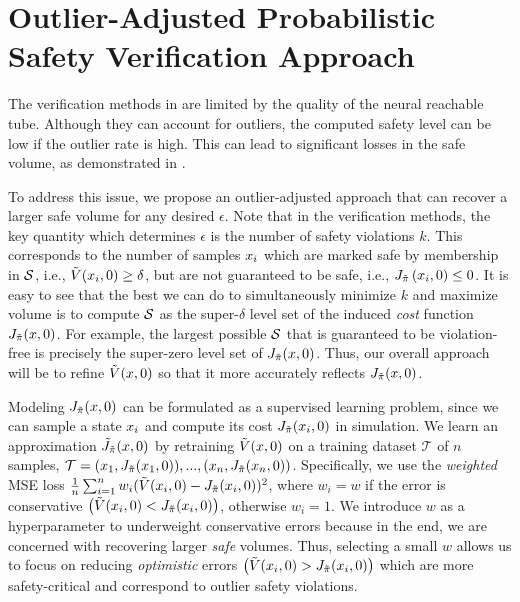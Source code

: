 \section{Outlier-Adjusted Probabilistic Safety Verification Approach}
\vspace{-0.5em}
The verification methods in  are limited by the quality of the neural reachable tube.
Although they can account for outliers, the computed safety level can be low if the outlier rate is high.
This can lead to significant losses in the safe volume, as demonstrated in .

To address this issue, we propose an outlier-adjusted approach that can recover a larger safe volume for any desired $\epsilon$.
Note that in the verification methods, the key quantity which determines $\epsilon$ is the number of safety violations $k$.
This corresponds to the number of samples $x_i$ which are marked safe by membership in $\mathcal{S}$, i.e., $\Tilde{V}(x_i,0) \ge \delta$, but are not guaranteed to be safe, i.e., $J_{\Tilde{\pi}}\left(x_i,0\right) \le 0$.
It is easy to see that the best we can do to simultaneously minimize $k$ and maximize volume is to compute $\mathcal{S}$ as the super-$\delta$ level set of the induced \textit{cost} function $J_{\Tilde{\pi}}(x,0)$.
For example, the largest possible $\mathcal{S}$ that is guaranteed to be violation-free is precisely the super-zero level set of $J_{\Tilde{\pi}}(x,0)$.
Thus, our overall approach will be to refine $\Tilde{V}(x,0)$ so that it more accurately reflects $J_{\Tilde{\pi}}(x,0)$.

Modeling $J_{\Tilde{\pi}}(x,0)$ can be formulated as a supervised learning problem, since we can sample a state $x_i$ and compute its cost $J_{\Tilde{\pi}}(x_i,0)$ in simulation.
We learn an approximation $\Tilde{J}_{\Tilde{\pi}}(x,0)$ by retraining $\Tilde{V}(x,0)$ on a training dataset $\mathcal{T}$ of $n$ samples, $\mathcal{T} = (x_1, J_{\Tilde{\pi}}(x_1,0)), ..., (x_n, J_{\Tilde{\pi}}(x_n,0))$.
Specifically, we use the \textit{weighted} MSE loss $\frac{1}{n}\sum_{i=1}^{n}w_{i}(\Tilde{V}(x_i,0) - J_{\Tilde{\pi}}(x_i,0))^2$, where $w_{i} = w$ if the error is conservative $\left(\Tilde{V}(x_i,0) < J_{\Tilde{\pi}}(x_i,0)\right)$, otherwise $w_i = 1$.
We introduce $w$ as a hyperparameter to underweight conservative errors because in the end, we are concerned with recovering larger \textit{safe} volumes.
Thus, selecting a small $w$ allows us to focus on reducing \textit{optimistic} errors $\left(\Tilde{V}(x_i,0) > J_{\Tilde{\pi}}(x_i,0)\right)$ which are more safety-critical and correspond to outlier safety violations.

